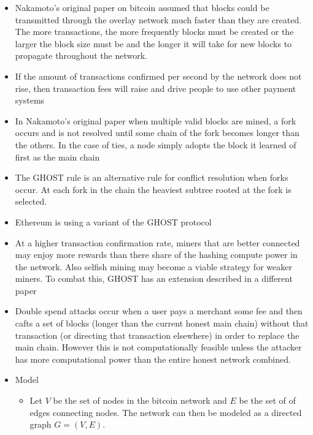\documentclass[a4paper]{article}
\begin{document}
\begin{itemize}
\item Nakamoto's original paper on bitcoin assumed that blocks could be transmitted through the overlay network much faster than they are created. The more transactions, the more frequently blocks must be created or the larger the block size must be and the longer it will take for new blocks to propagate throughout the network.

\item If the amount of transactions confirmed per second by the network does not rise, then transaction fees will raise and drive people to use other payment systems

\item In Nakamoto's original paper when multiple valid blocks are mined, a fork occurs and is not resolved until some chain of the fork becomes longer than the others. In the case of ties, a node simply adopts the block it learned of first as the main chain

\item The GHOST rule is an alternative rule for conflict resolution when forks occur. At each fork in the chain the heaviest subtree rooted at the fork is selected.

\item Ethereum is using a variant of the GHOST protocol

\item At a higher transaction confirmation rate, miners that are better connected may enjoy more rewards than there share of the hashing compute power in the network. Also selfish mining may become a viable strategy for weaker miners. To combat this, GHOST has an extension described in a different paper

\item Double spend attacks occur when a user pays a merchant some fee and then cafts a set of blocks (longer than the current honest main chain) without that transaction (or directing that transaction elsewhere) in order to replace the main chain. However this is not computationally feasible unless the attacker has more computational power than the entire honest network combined.

\item Model
\begin{itemize}
\item Let $V$ be the set of nodes in the bitcoin network and $E$ be the set of of edges connecting nodes. The network can then be modeled as a directed graph $G = (V, E)$.


\end{itemize}
\end{itemize}
\end{document}
